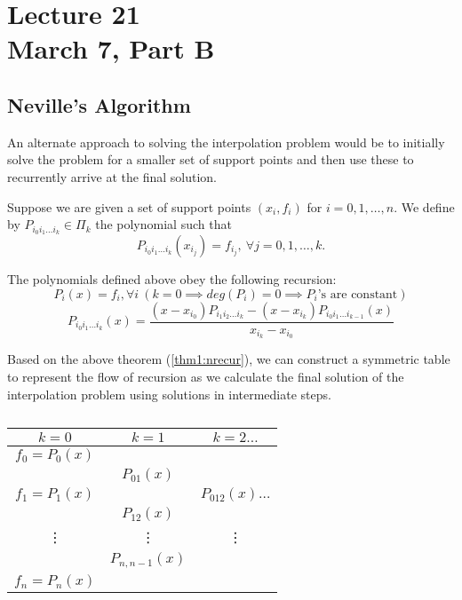\chapter*{Lecture 21 \\ March 7, Part B}
\setcounter{chapter}{21}
\setcounter{section}{0}
\setcounter{figure}{0}
\setcounter{equation}{0}

\section{Neville's Algorithm}

An alternate approach to solving the interpolation problem would be to initially solve the problem for a smaller set of support points and then use these to recurrently arrive at the final solution.\\
\begin{defn}\label{def1:npoly} 
Suppose we are given a set of support points $(x_i, f_i)$ for  $i=0,1, \ldots , n$. We define by $P_{i_0i_1\ldots i_k} \in \Pi _k$ the polynomial such that 
 \[
     P_{i_0i_1\ldots i_k}(x_{i_j}) = f_{i_j}, \  \forall j=0,1,\ldots,k
.\] 
\end{defn}
\begin{thm}\label{thm1:nrecur}
   The polynomials defined above obey the following recursion:
   \begin{equation}\label{eq1:l21}
      P_i(x) = f_i, \forall i \  (k=0 \implies deg(P_i)=0 \implies P_i\text{'s are constant})
   \end{equation}
   \begin{equation}\label{eq2:l21}
       P_{i_0i_1\ldots i_k}(x) = \frac{(x-x_{i_0})P_{i_1i_2\ldots i_k} - (x-x_{i_k})P_{i_0i_1\ldots i_{k-1}}(x)}{x_{i_k} - x_{i_0}}
   \end{equation}
\end{thm}

Based on the above theorem (\ref{thm1:nrecur}), we can construct a symmetric table to represent the flow of recursion as we calculate the final solution of the interpolation problem using solutions in intermediate steps.

\begin{table}
   \centering
   \caption{}
   \label{tab1:lec21}
   \begin{tabular}{|c|c|c}
      \hline
      $k=0$ & $k=1$ & $k=2 \hdots$ \\
      \hline
      $ f_0 = P_0(x)$ & & \\
         & $P_{01}(x)$ & \\
      $f_1 = P_1(x)$ & & $P_{012}(x) \hdots$ \\
                     & $P_{12}(x)$ & \\
      \vdots & \vdots & \vdots \\
             & $P_{n,n-1}(x)$ & \\
      $f_n = P_n(x)$ & &   \\
      \hline
   \end{tabular}
\end{table}


